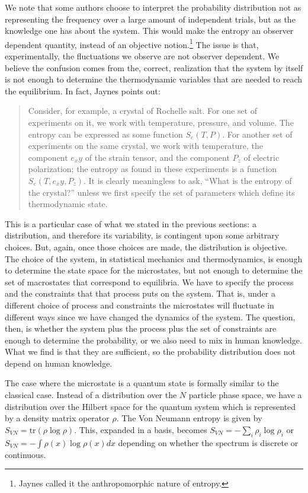 \documentclass{article}
\begin{document}
We note that some authors choose to interpret the probability distribution not as representing the frequency over a large amount of independent trials, but as the knowledge one has about the system. This would make the entropy an observer dependent quantity, instead of an objective notion.\footnote{Jaynes called it the anthropomorphic nature of entropy.} The issue is that, experimentally, the fluctuations we observe are not observer dependent. We believe the confusion comes from the, correct, realization that the system by itself is not enough to determine the thermodynamic variables that are needed to reach the equilibrium. In fact, Jaynes points out:
\begin{quote}
Consider, for example, a crystal of Rochelle salt. For one set of experiments on it, we work with temperature, pressure, and volume. The entropy can be expressed as some function $S_e(T,P)$. For another set of experiments on the same crystal, we work with temperature, the component $e_xy$ of the strain tensor, and the component $P_z$ of electric polarization; the entropy as found in these experiments is a function $S_e(T,e_xy,P_z)$. It is clearly  meaningless to ask, ``What is the entropy of the crystal?''  unless we first specify the set of parameters which define its thermodynamic state.
\end{quote}
This is a particular case of what we stated in the previous sections: a distribution, and therefore its variability, is contingent upon some arbitrary choices. But, again, once those choices are made, the distribution is objective. The choice of the system, in statistical mechanics and thermodynamics, is enough to determine the state space for the microstates, but not enough to determine the set of macrostates that correspond to equilibria. We have to specify the process and the constraints that that process puts on the system. That is, under a different choice of process and constraints the microstates will fluctuate in different ways since we have changed the dynamics of the system. The question, then, is whether the system plus the process plus the set of constraints are enough to determine the probability, or we also need to mix in human knowledge. What we find is that they are sufficient, so the probability distribution does not depend on human knowledge.

The case where the microstate is a quantum state is formally similar to the classical case. Instead of a distribution over the $N$ particle phase space, we have a distribution over the Hilbert space for the quantum system which is represented by a density matrix operator $\rho$. The Von Neumann entropy is given by $S_{VN} = \textrm{tr}(\rho \log \rho)$. This, expanded in a basis, becomes $S_{VN} = - \sum_i \rho_i \log \rho_i$ or $S_{VN} = - \int \rho(x) \log \rho(x)dx$ depending on whether the spectrum is discrete or continuous.
\end{document}
